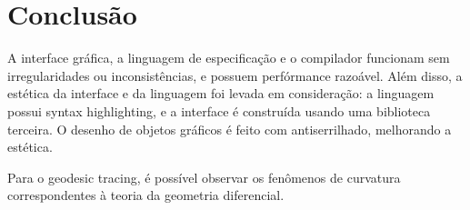 \chapter{Conclusão}

A interface gráfica, a linguagem de especificação e o compilador
funcionam sem irregularidades ou inconsistências, e possuem perfórmance razoável.
Além disso, a estética da interface e da linguagem foi levada em consideração:
a linguagem possui syntax highlighting, e a interface é construída usando uma biblioteca
terceira. O desenho de objetos gráficos é feito com antiserrilhado, melhorando a estética.

Para o geodesic tracing, é possível observar os fenômenos de curvatura
correspondentes à teoria da geometria diferencial.